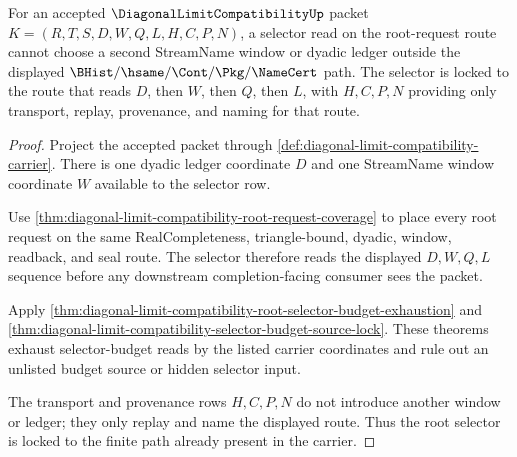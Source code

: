 \begin{theorem}
\label{thm:diagonal-limit-compatibility-root-selector-lock}
For an accepted $\DiagonalLimitCompatibilityUp$ packet $K=(R,T,S,D,W,Q,L,H,C,P,N)$, a selector read on the root-request route cannot choose a second StreamName window or dyadic ledger outside the displayed $\BHist/\hsame/\Cont/\Pkg/\NameCert$ path. The selector is locked to the route that reads $D$, then $W$, then $Q$, then $L$, with $H,C,P,N$ providing only transport, replay, provenance, and naming for that route.
\end{theorem}
\begin{proof}
Project the accepted packet through \autoref{def:diagonal-limit-compatibility-carrier}. There is one dyadic ledger coordinate $D$ and one StreamName window coordinate $W$ available to the selector row.

Use \autoref{thm:diagonal-limit-compatibility-root-request-coverage} to place every root request on the same RealCompleteness, triangle-bound, dyadic, window, readback, and seal route. The selector therefore reads the displayed $D,W,Q,L$ sequence before any downstream completion-facing consumer sees the packet.

Apply \autoref{thm:diagonal-limit-compatibility-root-selector-budget-exhaustion} and \autoref{thm:diagonal-limit-compatibility-selector-budget-source-lock}. These theorems exhaust selector-budget reads by the listed carrier coordinates and rule out an unlisted budget source or hidden selector input.

The transport and provenance rows $H,C,P,N$ do not introduce another window or ledger; they only replay and name the displayed route. Thus the root selector is locked to the finite path already present in the carrier.
\end{proof}


